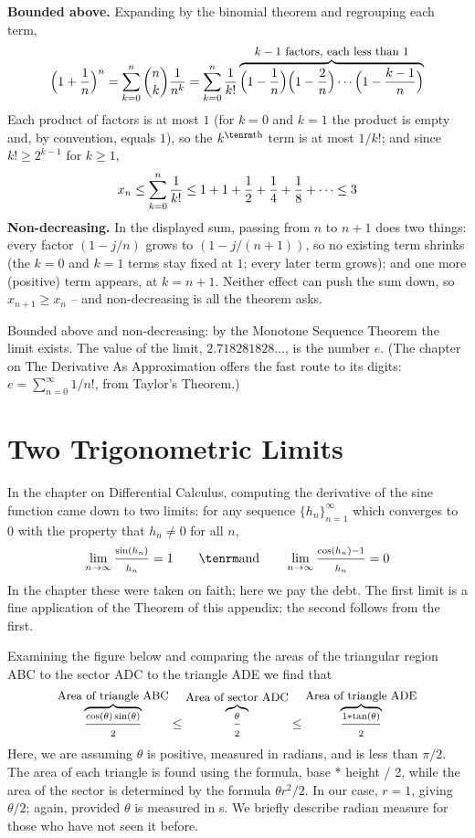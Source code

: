 {\bf Bounded above.} Expanding by the binomial theorem and regrouping each
term,
$$
\Bigl(1 + {1\over n}\Bigr)^n = \sum_{k=0}^n {n \choose k} {1 \over n^k}
= \sum_{k=0}^{n} {1 \over k!}
\mathop{\overbrace{\Bigl(1 - {1\over n}\Bigr)\Bigl(1 - {2 \over n}\Bigr)
\cdots\Bigl(1 - {k-1 \over n}\Bigr)}}\limits^{\hbox{\small $k-1$ factors, each less than $1$}}
$$
Each product of factors is at most $1$ (for $k = 0$ and $k = 1$ the product
is empty and, by convention, equals $1$), so the $k^{\rm th}$ term is at most
$1/k!$; and since $k! \ge 2^{k-1}$ for $k \ge 1$,
$$
x_n \le \sum_{k=0}^{n} {1 \over k!} \le 1 + 1 + {1 \over 2} + {1 \over 4} +
{1 \over 8} + \cdots \le 3
$$
{\bf Non-decreasing.} In the displayed sum, passing from $n$ to $n+1$ does
two things: every factor $(1 - j/n)$ grows to $(1 - j/(n+1))$, so no
existing term shrinks (the $k = 0$ and $k = 1$ terms stay fixed at $1$;
every later term grows); and one more (positive) term appears, at $k = n+1$.
Neither effect can push the sum down, so $x_{n+1} \ge x_n$ -- and
non-decreasing is all the theorem asks.

Bounded above and non-decreasing: by the Monotone Sequence Theorem the
limit exists. The value of the limit, $2.718281828\ldots$, is the
number $e$. (The
chapter on The Derivative As Approximation offers the fast route to its
digits: $e = \sum_{n=0}^{\infty} 1/n!$, from Taylor's Theorem.)

\section{Two Trigonometric Limits}
In the chapter on Differential Calculus, computing the derivative of the
sine function came down to two limits: for any sequence
$\{h_n\}_{n=1}^\infty$ which converges to $0$ with the property that
$h_n \ne 0$ for all $n$,
$$
\lim_{n\rightarrow \infty} \frac{\sin(h_n)}{h_n} = 1
\qquad {\rm and} \qquad
\lim_{n\rightarrow \infty} \frac{\cos(h_n) - 1}{h_n} = 0
$$
In the chapter these were taken on faith; here we pay the debt. The first
limit is a fine application of the  Theorem of this
appendix; the second follows from the first.

Examining the figure below and comparing the areas of the triangular region ABC to 
the sector ADC to the triangle ADE we find that 
$$
\mathop{\overbrace{{{\scriptstyle \cos(\theta)\sin(\theta)} \over {\scriptstyle 2}}}}\limits^{\hbox{\small Area of triangle ABC}} \le 
\mathop{\overbrace{{{\scriptstyle \theta} \over {\scriptstyle 2}}}}\limits^{\hbox{\small Area of sector ADC}} \le 
\mathop{\overbrace{{{\scriptstyle 1 * \tan(\theta)} \over {\scriptstyle 2}}}}\limits^{\hbox{\small Area of triangle ADE}}
$$
Here, we are assuming $\theta$ is positive, measured in radians, and 
is less than $\pi/2$. The area of each triangle is found using the formula, 
base * height / 2, while the area of the sector is determined by the formula 
$\theta r^2/2$. In our case, $r = 1$, giving $\theta/2$; again, 
provided $\theta$ is measured in s. We briefly describe 
radian measure for those who have not seen it before.

